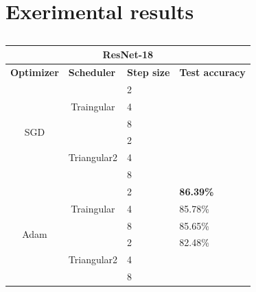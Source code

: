 








\newpage
\appendix
\section{Exerimental results}


\begin{table}[ht!]
\centering
\caption{}
\label{tab:my-table}
\begin{tabular}{|ccll|}
\hline
\multicolumn{4}{|c|}{\textbf{ResNet-18}}                                          \\ \hline
\multicolumn{1}{|l|}{\textbf{Optimizer}}    & \multicolumn{1}{l|}{\textbf{Scheduler}}           & \multicolumn{1}{l|}{\textbf{Step size}} & \textbf{Test accuracy} \\ \hline
\multicolumn{1}{|c|}{\multirow{6}{*}{SGD}}  & \multicolumn{1}{c|}{\multirow{3}{*}{Traingular}}  & \multicolumn{1}{l|}{2}                  &                        \\ \cline{3-4} 
\multicolumn{1}{|c|}{} & \multicolumn{1}{c|}{} & \multicolumn{1}{l|}{4} &         \\ \cline{3-4} 
\multicolumn{1}{|c|}{} & \multicolumn{1}{c|}{} & \multicolumn{1}{l|}{8} &         \\ \cline{2-4} 
\multicolumn{1}{|c|}{}                      & \multicolumn{1}{c|}{\multirow{3}{*}{Triangular2}} & \multicolumn{1}{l|}{2}                  &                        \\ \cline{3-4} 
\multicolumn{1}{|c|}{} & \multicolumn{1}{c|}{} & \multicolumn{1}{l|}{4} &         \\ \cline{3-4} 
\multicolumn{1}{|c|}{} & \multicolumn{1}{c|}{} & \multicolumn{1}{l|}{8} &         \\ \hline
\multicolumn{1}{|c|}{\multirow{6}{*}{Adam}} & \multicolumn{1}{c|}{\multirow{3}{*}{Traingular}}  & \multicolumn{1}{l|}{2}                  & \textbf{86.39\%}       \\ \cline{3-4} 
\multicolumn{1}{|c|}{} & \multicolumn{1}{c|}{} & \multicolumn{1}{l|}{4} & 85.78\% \\ \cline{3-4} 
\multicolumn{1}{|c|}{} & \multicolumn{1}{c|}{} & \multicolumn{1}{l|}{8} & 85.65\% \\ \cline{2-4} 
\multicolumn{1}{|c|}{}                      & \multicolumn{1}{c|}{\multirow{3}{*}{Triangular2}} & \multicolumn{1}{l|}{2}                  & 82.48\%                \\ \cline{3-4} 
\multicolumn{1}{|c|}{} & \multicolumn{1}{c|}{} & \multicolumn{1}{l|}{4} &         \\ \cline{3-4} 
\multicolumn{1}{|c|}{} & \multicolumn{1}{c|}{} & \multicolumn{1}{l|}{8} &         \\ \hline
\end{tabular}
\end{table}





